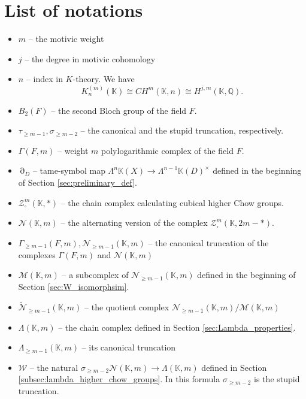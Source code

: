 \documentclass[12pt]{extarticle}
\def\mb{\mathbb}
\def\mc{\mathcal}
\def\L{\Lambda}
\def\k{\mb K}
\def\Q{\mb Q}
\def\wt{\widetilde}
\DeclareMathOperator{\ts}{\partial}
\begin{document}
\section{List of notations}
\begin{itemize}
\item $m$ -- the motivic weight
\item $j$ -- the degree in motivic cohomology
\item $n$  -- index in $K$-theory. We have $$K_n^{(m)}(\k)\cong CH^m(\k,n)\cong H^{j,m}(\k,\Q).$$
\item $B_2(F)$ -- the second Bloch group of the field $F$.
\item $\tau_{\geq m-1},\sigma_{\geq m-2}$ -- the canonical and the stupid truncation, respectively.
    \item $\Gamma(F,m)$ -- weight $m$ polylogarithmic complex of the field $F$.
    \item $\ts_D$ -- tame-symbol map $\Lambda^n\k(X)\to \Lambda^{n-1}\k(D)^\times$ defined in the beginning of Section \ref{sec:preliminary_def}.
    \item $\mc Z_\square^m(\k,*)$ -- the chain complex calculating cubical higher Chow groups. 
    \item $\mc N(\k,m)$ -- the alternating version of the complex $\mc Z_\square^m(\k,2m-*)$.
        
    \item $\Gamma_{\geq m-1}(F,m), \mc N_{\geq m-1}(\k,m)$ -- the canonical truncation of the complexes $\Gamma(F,m)$ and $\mc N(\k,m)$
    \item $\mc M(\k,m)$ -- a subcomplex of $\mc N_{\geq m-1}(\k,m)$ defined in the beginning of Section \ref{sec:W_isomorphsim}.
    \item $\wt {\mc N}_{\geq m-1}(\k,m)$ -- the quotient complex $\mc N_{\geq m-1}(\k,m)/\mc M(\k,m)$
\item $\Lambda(\k,m)$ -- the chain complex defined in Section \ref{sec:Lambda_properties}.
    \item $\Lambda_{\geq m-1}(\k,m)$ -- its canonical truncation
    \item $\mc W$ -- the natural $\sigma_{\geq m-2}\mc N(\k,m)\to \L(\k,m)$ defined in Section \ref{subsec:lambda_higher_chow_groups}. In this formula $\sigma_{\geq m-2}$ is the stupid truncation.


\end{itemize}
\end{document}
